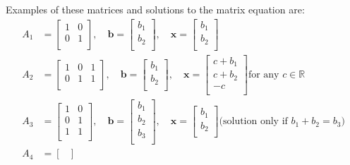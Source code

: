 \documentclass[a4paper]{article}
\begin{document}
Examples of these matrices and solutions to the matrix equation are:
\begin{align*}
	A_{1} & =
	\begin{bmatrix}
		1 & 0 \\
		0 & 1 \\
	\end{bmatrix},
	\quad
	\bm{b} =
	\begin{bmatrix}
		b_{1} \\
		b_{2} \\
	\end{bmatrix},
	\quad
	\bm{x} =
	\begin{bmatrix}
		b_{1} \\
		b_{2} \\
	\end{bmatrix} \\
	A_{2} & =
	\begin{bmatrix}
		1 & 0 & 1 \\
		0 & 1 & 1 \\
	\end{bmatrix},
	\quad
	\bm{b} =
	\begin{bmatrix}
		b_{1} \\
		b_{2} \\
	\end{bmatrix},
	\quad
	\bm{x} =
	\begin{bmatrix}
		c + b_{1} \\
		c + b_{2} \\
		-c \\
	\end{bmatrix} \text{for any } c \in \mathbb{R} \\
	A_{3} & =
	\begin{bmatrix}
		1 & 0 \\
		0 & 1 \\
		1 & 1 \\
	\end{bmatrix},
	\quad
	\bm{b} =
	\begin{bmatrix}
		b_{1} \\
		b_{2} \\
		b_{3} \\
	\end{bmatrix},
	\quad
	\bm{x} =
	\begin{bmatrix}
		b_{1} \\
		b_{2} \\
	\end{bmatrix} \text{(solution only if } b_{1} + b_{2} = b_{3} \text{)} \\
	A_{4} & =
	\begin{bmatrix}

\end{bmatrix}
\end{align*}
\end{document}
